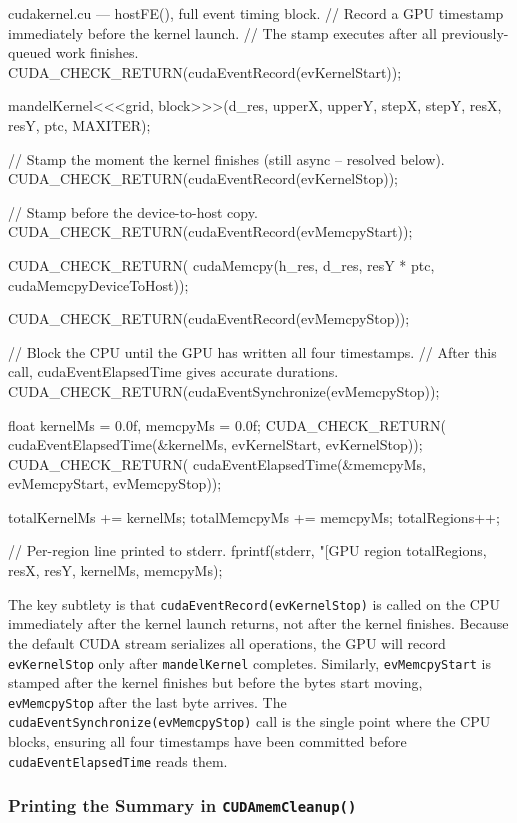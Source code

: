 \documentclass[
	english,
	letterpaper, oneside
]{article}
\begin{document}
\begin{sourcecode}{cuda}{kernel.cu — hostFE(), full event timing block.}
// Record a GPU timestamp immediately before the kernel launch.
// The stamp executes after all previously-queued work finishes.
CUDA_CHECK_RETURN(cudaEventRecord(evKernelStart));

mandelKernel<<<grid, block>>>(d_res, upperX, upperY,
                               stepX, stepY, resX, resY, ptc, MAXITER);

// Stamp the moment the kernel finishes (still async -- resolved below).
CUDA_CHECK_RETURN(cudaEventRecord(evKernelStop));

// Stamp before the device-to-host copy.
CUDA_CHECK_RETURN(cudaEventRecord(evMemcpyStart));

CUDA_CHECK_RETURN(
    cudaMemcpy(h_res, d_res, resY * ptc, cudaMemcpyDeviceToHost));

CUDA_CHECK_RETURN(cudaEventRecord(evMemcpyStop));

// Block the CPU until the GPU has written all four timestamps.
// After this call, cudaEventElapsedTime gives accurate durations.
CUDA_CHECK_RETURN(cudaEventSynchronize(evMemcpyStop));

float kernelMs = 0.0f, memcpyMs = 0.0f;
CUDA_CHECK_RETURN(
    cudaEventElapsedTime(&kernelMs, evKernelStart, evKernelStop));
CUDA_CHECK_RETURN(
    cudaEventElapsedTime(&memcpyMs, evMemcpyStart, evMemcpyStop));

totalKernelMs += kernelMs;
totalMemcpyMs += memcpyMs;
totalRegions++;

// Per-region line printed to stderr.
fprintf(stderr,
    "[GPU region %
    totalRegions, resX, resY, kernelMs, memcpyMs);
\end{sourcecode}

The key subtlety is that \texttt{cudaEventRecord(evKernelStop)} is called
on the CPU immediately after the kernel launch returns, not after
the kernel finishes. Because the default CUDA stream serializes all
operations, the GPU will record \texttt{evKernelStop} only after
\texttt{mandelKernel} completes. Similarly, \texttt{evMemcpyStart} is
stamped after the kernel finishes but before the bytes start moving,
\texttt{evMemcpyStop} after the last byte arrives. The
\texttt{cudaEventSynchronize(evMemcpyStop)} call is the single point
where the CPU blocks, ensuring all four timestamps have been committed
before \texttt{cudaEventElapsedTime} reads them.

\subsubsection{Printing the Summary in \texttt{CUDAmemCleanup()}}
\end{document}
